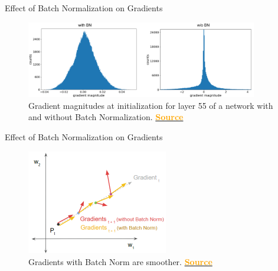 \documentclass[serif, aspectratio=169]{beamer}
\begin{document}
\begin{frame}{Effect of Batch Normalization on Gradients}
        \begin{figure}
        \includegraphics[width=0.9\textwidth]{pic/BN_Grad_Dist.png}
        \caption{Gradient magnitudes at initialization for layer 55 of a network with and without Batch Normalization. \href{https://doi.org/10.48550/arXiv.1806.02375}{\textcolor{orange}{\textbf{Source}}}}
        \label{fig:BN_Dist}
    \end{figure}
\end{frame}

\begin{frame}{Effect of Batch Normalization on Gradients}
        \begin{figure}
        \includegraphics[width=0.55\textwidth]{pic/Smooth.png}
        \caption{Gradients with Batch Norm are smoother. \href{https://ketanhdoshi.github.io/Batch-Norm-Why/}{\textcolor{orange}{\textbf{Source}}}}
        \label{fig:Smooth}
    \end{figure}
\end{frame}
\end{document}
